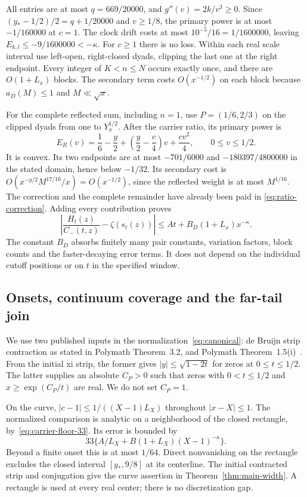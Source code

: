 All entries are at most $q=669/20000$, and $g''(v)=2k/v^3\ge0$.
Since $(y_*-1/2)/2=q+1/20000$ and $v\ge1/8$, the primary power
is at most $-1/160000$ at $c=1$.
The clock drift costs at most $10^{-5}/16=1/1600000$, leaving
$E_{k,l}\le-9/1600000<-\kappa$. For $c\ge1$ there is no loss.
Within each real scale interval use left-open, right-closed dyads,
clipping the last one at the right endpoint. Every integer of
$K<n\le N$ occurs exactly once, and there are $O(1+L_x)$ blocks.
The secondary term costs $O(x^{-1/2})$ on each block because
$a_D(M)\le1$ and $M\ll\sqrt x$.

For the complete reflected sum, including $n=1$, use $P=(1/6,2/3)$
on the clipped dyads from one to $Y_x^{1/2}$. After the carrier
ratio, its primary power is
\[
 E_R(v)=\frac16-\frac y2+\left(\frac y2-\frac c4\right)v
                         +\frac{cv^2}{4},\qquad0\le v\le1/2.
\]
It is convex. Its two endpoints are at most $-701/6000$ and
$-180397/4800000$ in the stated domain, hence below $-1/32$.
Its secondary cost is
$O(x^{-y/2}M^{17/16}/x)=O(x^{-1/2})$, since the reflected
weight is at most $M^{1/16}$.
The correction and the complete remainder have already been paid in
\eqref{eq:ratio-correction}. Adding every contribution proves
\begin{equation}\label{eq:complete-comparison}
 \left|\frac{H_t(z)}{C_-(t,z)}-\zeta(s_t(z))\right|
 \le At+B_D(1+L_x)x^{-\kappa}.
\end{equation}
The constant $B_D$ absorbs finitely many pair constants, variation
factors, block counts and the faster-decaying error terms. It does
not depend on the individual cutoff positions or on $t$ in the
specified window.

\subsection{Onsets, continuum coverage and the far-tail join}

We use two published inputs in the normalization~\eqref{eq:canonical}:
de Bruijn strip contraction as stated in Polymath Theorem~3.2, and
Polymath Theorem~1.5(i)~\cite{Polymath}. From the initial xi strip,
the former gives $|y|\le\sqrt{1-2t}$ for zeros at $0\le t\le1/2$.
The latter supplies an absolute $C_P>0$ such that zeros with
$0<t\le1/2$ and $x\ge\exp(C_P/t)$ are real. We do not set $C_P=1$.

On the curve, $|c-1|\le1/((X-1)L_X)$ throughout $|x-X|\le1$.
The normalized comparison is analytic on a neighborhood of the
closed rectangle, by~\eqref{eq:carrier-floor-33}. Its error is bounded by
\[
 33\{A/L_X+B(1+L_X)(X-1)^{-\kappa}\}.
\]
Beyond a finite onset this is at most $1/64$. Direct nonvanishing on
the rectangle excludes the closed interval $[y_*,9/8]$ at its
centerline. The initial contracted strip and conjugation give the
curve assertion in Theorem~\ref{thm:main-width}. A rectangle is used
at every real center; there is no discretization gap.

